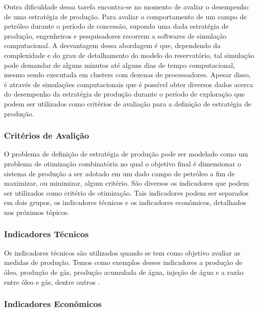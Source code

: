 Outra dificuldade dessa tarefa encontra-se no momento de avaliar o desempenho de uma estratégia de produção. Para avaliar o comportamento de um campo de petróleo durante o período de concessão, supondo uma dada estratégia de produção, engenheiros e pesquisadores recorrem a softwares de simulação computacional. A desvantagem dessa abordagem é que, dependendo da complexidade e do grau de detalhamento do modelo do reservatório, tal simulação pode demandar de alguns minutos até alguns dias de tempo computacional, mesmo sendo executada em clusters com dezenas de processadores. Apesar disso, é através de simulações computacionais que é possível obter diversos dados acerca do desempenho da estratégia de produção durante o período de exploração que podem ser utilizados como critérios de avaliação para a definição de estratégia de produção. 

\subsubsection{Critérios de Avalição}

O problema de definição de estratégia de produção pode ser modelado como um problema de otimização combinatória no qual o objetivo final é dimensionar o sistema de produção a ser adotado em um dado campo de petróleo a fim de maximizar, ou minimizar, algum critério. São diversos os indicadores que podem ser utilizados como critério de otimização. Tais indicadores podem ser separados em dois grupos, os indicadores técnicos e os indicadores econômicos, detalhados nos próximos tópicos. 

\subsubsection{Indicadores Técnicos}

Os indicadores técnicos são utilizados quando se tem como objetivo avaliar as medidas de produção. Temos como exemplos desses indicadores a produção de óleo, produção de gás, produção acumulada de água, injeção de água e a razão entre óleo e gás, dentre outros \cite{Neves2004, Avansi2008}.

\subsubsection{Indicadores Econômicos}

